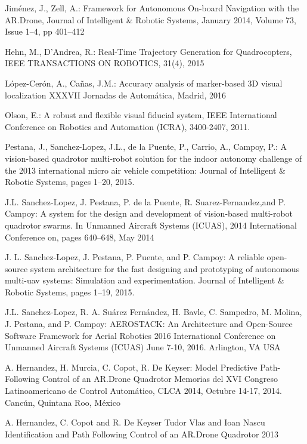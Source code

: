\documentclass{styles/svproc}
\begin{document}
\begin{thebibliography}{6}
  Jiménez, J., Zell, A.: 
  Framework for Autonomous On-board Navigation with the AR.Drone, 
  Journal of Intelligent \& Robotic Systems, January 2014, Volume 73, Issue 1–4, pp 401–412

  Hehn, M., D'Andrea, R.: 
  Real-Time Trajectory Generation for Quadrocopters, 
  IEEE TRANSACTIONS ON ROBOTICS,  31(4), 2015

  López-Cerón, A., Cañas, J.M.: 
  Accuracy analysis of marker-based 3D visual localization
  XXXVII Jornadas de Automática, Madrid, 2016 %

  Olson, E.: 
  A robust and flexible visual fiducial system, 
  IEEE International Conference on Robotics and Automation (ICRA), 3400-2407, 2011.

  Pestana, J., Sanchez-Lopez, J.L., de la Puente, P., Carrio, A., Campoy, P.:
  A vision-based quadrotor multi-robot solution for the indoor autonomy challenge of the 2013 international micro air vehicle competition:
  Journal of Intelligent \& Robotic Systems, pages 1–20, 2015.
  
  J.L. Sanchez-Lopez, J. Pestana, P. de la Puente, R. Suarez-Fernandez,and P. Campoy:
  A system for the design and development of vision-based multi-robot quadrotor swarms.
  In Unmanned Aircraft Systems (ICUAS), 2014 International Conference on, pages 640–648, May 2014
  
  J. L. Sanchez-Lopez, J. Pestana, P. Puente, and P. Campoy:
  A reliable open-source system architecture for the fast designing and prototyping of autonomous multi-uav systems: Simulation and experimentation.
  Journal of Intelligent \& Robotic Systems, pages 1–19, 2015.

  J.L. Sanchez-Lopez, R. A. Suárez Fernández, H. Bavle, C. Sampedro, M. Molina, J. Pestana, and P. Campoy:
  AEROSTACK: An Architecture and Open-Source Software Framework for Aerial Robotics
  2016 International Conference on Unmanned Aircraft Systems (ICUAS) June 7-10, 2016. Arlington, VA USA

  A. Hernandez, H. Murcia, C. Copot, R. De Keyser:
  Model Predictive Path-Following Control of an AR.Drone Quadrotor 
  Memorias del XVI Congreso Latinoamericano de Control Automático, CLCA 2014, Octubre 14-17, 2014. Cancún, Quintana Roo, México

  A. Hernandez, C. Copot and R. De Keyser Tudor Vlas and Ioan Nascu
  Identification and Path Following Control of an AR.Drone Quadrotor
  2013


\end{thebibliography}
\end{document}
